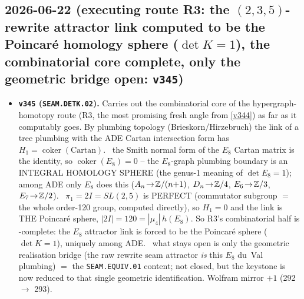 \subsection*{2026-06-22 (executing route R3: the $(2,3,5)$-rewrite attractor link computed to be the Poincar\'e homology sphere ($\det K{=}1$), the combinatorial core complete, only the geometric bridge open: \texttt{v345})}
\begin{itemize}
\item \textbf{\texttt{v345} (\texttt{SEAM.DETK.02}).} Carries out the combinatorial core of the hypergraph-homotopy
route (R3, the most promising fresh angle from \vref{v344}) as far as it computably goes. By plumbing topology
(Brieskorn/Hirzebruch) the link of a tree plumbing with the ADE Cartan intersection form has
$H_1=\operatorname{coker}(\mathrm{Cartan})$. \mE\ the Smith normal form of the $E_8$ Cartan matrix is the identity,
so $\operatorname{coker}(E_8)=0$ -- the $E_8$-graph plumbing boundary is an INTEGRAL HOMOLOGY SPHERE (the genus-1
meaning of $\det E_8{=}1$); among ADE only $E_8$ does this ($A_n\!\to\!\mathbb{Z}/(n{+}1)$, $D_n\!\to\!\mathbb{Z}/4$,
$E_6\!\to\!\mathbb{Z}/3$, $E_7\!\to\!\mathbb{Z}/2$). \mE\ $\pi_1=2I=SL(2,5)$ is PERFECT (commutator subgroup $=$ the whole order-120
group, computed directly), so $H_1=0$ and the link is THE Poincar\'e sphere, $|2I|=120=|\mu_4|\,h(E_8)$. So R3's
combinatorial half is \mE-complete: the $E_8$ attractor link is forced to be the Poincar\'e sphere ($\det K{=}1$),
uniquely among ADE. \mO\ what stays open is only the geometric realisation bridge (the raw rewrite seam attractor
\emph{is} this $E_8$ du~Val plumbing) $=$ the \texttt{SEAM.EQUIV.01} content; not closed, but the keystone is now
reduced to that single geometric identification. Wolfram mirror $+1$ (292 $\to$ 293).
\end{itemize}

